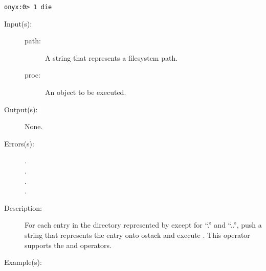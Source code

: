 \begin{description}
\begin{description}
\begin{verbatim}
onyx:0> 1 die
		\end{verbatim}
	\end{description}
\label{systemdict:dirforeach}
\item[{\onyxop{path proc}{dirforeach}{--}}: ]
	\begin{description}\item[]
	\item[Input(s): ]
		\begin{description}\item[]
		\item[path: ]
			A string that represents a filesystem path.
		\item[proc: ]
			An object to be executed.
		\end{description}
	\item[Output(s): ] None.
	\item[Errors(s): ]
		\begin{description}\item[]
		\item[.]
		\item[.]
		\item[.]
		\item[.]
		\end{description}
	\item[Description: ]
		For each entry in the directory represented by 
		except for ``.'' and ``..'', push a string that represents the
		entry onto ostack and execute .  This operator
		supports the
		 and
		 operators.
	\item[Example(s): ]\begin{verbatim}


\end{verbatim}
\end{description}
\end{description}
